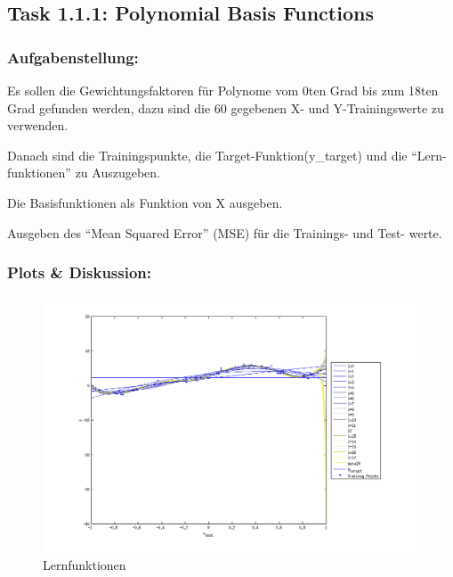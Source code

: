 \subsection{Task 1.1.1: Polynomial Basis Functions}

\subsubsection{Aufgabenstellung:}


Es sollen die Gewichtungsfaktoren für Polynome vom 0ten Grad bis zum 18ten Grad gefunden werden, dazu sind die 60 gegebenen X- und Y-Trainingswerte zu verwenden.


Danach sind die Trainingspunkte, die Target-Funktion(y\_target) und die ``Lern-funktionen'' zu Auszugeben.


Die Basisfunktionen als Funktion von X ausgeben.

Ausgeben des ``Mean Squared Error'' (MSE) für die Trainings- und Test- werte.


\subsubsection{Plots \& Diskussion:}
\begin{figure}[hp!]
\begin{center}
 \includegraphics[width=0.99\textwidth]{./figures/1_1_1_unscaled_learn_fct}
 \caption[Lernfunktionen]{Lernfunktionen}
\label{fig:unscaled_learn_fct}
\end{center}
\end{figure}


